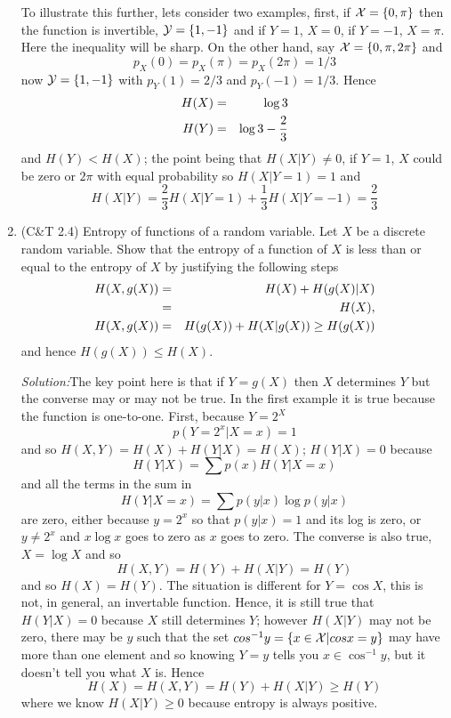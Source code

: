\documentclass[12pt]{article}
\newcommand{\soln}{\noindent\textit{Solution:}}
\begin{document}
\begin{enumerate}
To illustrate this further, lets consider two examples, first, if
${\cal X}=\{0,\pi\}$ then the function is invertible, ${\cal
  Y}=\{1,-1\}$ and if $Y=1$, $X=0$, if $Y=-1$, $X=\pi$. Here the
inequality will be sharp. On the other hand, say ${\cal X}=\{0,\pi,2\pi\}$ and 
\begin{equation}
p_X(0)=p_X(\pi)=p_X(2\pi)=1/3
\end{equation}
now ${\cal Y}=\{1,-1\}$ with $p_Y(1)=2/3$ and $p_Y(-1)=1/3$. Hence 
\begin{eqnarray}
H(X)&=&\log{3}\cr
H(Y)&=&\log{3}-\frac{2}{3}
\end{eqnarray}
and $H(Y)<H(X)$; the point being that $H(X|Y)\not=0$, if $Y=1$, $X$ could be zero or $2\pi$ with equal probability so $H(X|Y=1)=1$ and
\begin{equation}
H(X|Y)=\frac{2}{3}H(X|Y=1)+\frac{1}{3}H(X|Y=-1)=\frac{2}{3}
\end{equation}


\item (C\&T 2.4) Entropy of functions of a random variable. Let $X$ be a discrete random variable. Show that the entropy of a function of $X$ is less than or equal to the entropy of $X$ by justifying the following steps
\begin{eqnarray}
H(X,g(X))&=&H(X)+H(g(X)|X)\cr
         &=&H(X),\cr
H(X,g(X))&=&H(g(X))+H(X|g(X))\ge H(g(X))
\end{eqnarray}
and hence $H(g(X))\le H(X)$.

\soln The key point here is that if $Y=g(X)$ then $X$ determines $Y$ but the converse may or may not be true. In the first example it is true because the function is one-to-one. First, because $Y=2^X$
\begin{equation}
p(Y=2^x|X=x)=1
\end{equation}
and so $H(X,Y)=H(X)+H(Y|X)=H(X)$; $H(Y|X)=0$ because
\begin{equation}
H(Y|X)=\sum p(x)H(Y|X=x)
\end{equation}
and all the terms in the sum in 
\begin{equation}
H(Y|X=x)=\sum p(y|x)\log{p(y|x)}
\end{equation}
are zero, either because $y=2^x$ so that $p(y|x)=1$ and its log is zero, or
$y\not=2^x$ and $x\log{x}$ goes to zero as $x$ goes to zero. The converse is also true, $X=\log{X}$ and so 
\begin{equation}
H(X,Y)=H(Y)+H(X|Y)=H(Y)
\end{equation}
and so $H(X)=H(Y)$. The situation is different for $Y=\cos{X}$, this
is not, in general, an invertable function. Hence, it is still true
that $H(Y|X)=0$ because $X$ still determines $Y$; however $H(X|Y)$ may
not be zero, there may be $y$ such that the set
$cos^{-1}{y}=\{x\in{\cal X}|cos{x}=y\}$ may have more than one element
and so knowing $Y=y$ tells you $x\in \cos^{-1}y$, but it doesn't tell you what $X$ is. Hence
\begin{equation}
H(X)=H(X,Y)=H(Y)+H(X|Y)\ge H(Y)
\end{equation}
where we know $H(X|Y)\ge 0$ because entropy is always positive.


\end{enumerate}
\end{document}
